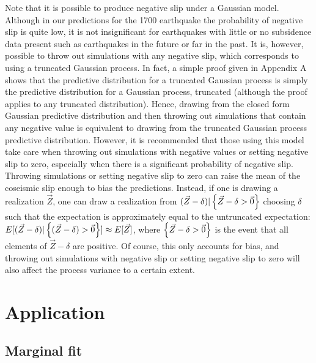 {Note that it is possible to produce negative slip under a Gaussian model.  Although in our predictions for the 1700 earthquake the probability of negative slip is quite low, it is not insignificant for earthquakes with little or no subsidence data present such as earthquakes in the future or far in the past.  It is, however, possible to throw out simulations with any negative slip, which corresponds to using a truncated Gaussian process.  In fact, a simple proof given in Appendix A shows that the predictive distribution for a truncated Gaussian process is simply the predictive distribution for a Gaussian process, truncated (although the proof applies to any truncated distribution).  Hence, drawing from the closed form Gaussian predictive distribution and then throwing out simulations that contain any negative value is equivalent to drawing from the truncated Gaussian process predictive distribution.  However, it is recommended that those using this model take care when throwing out simulations with negative values or setting negative slip to zero, especially when there is a significant probability of negative slip.  Throwing simulations or setting negative slip to zero can raise the mean of the coseismic slip enough to bias the predictions.  Instead, if one is drawing a realization $\vec{Z}$, one can draw a realization from $(\vec{Z} - \delta)  \vert \left\{\vec{Z} - \delta > \vec{0}\right\}$ choosing $\delta$ such that the expectation is approximately equal to the untruncated expectation: $E[(\vec{Z} - \delta) \vert \left\{(\vec{Z} - \delta) > \vec{0}\right\}] \approx E[\vec{Z}]$, where $\left\{\vec{Z} - \delta > \vec{0}\right\}$ is the event that all elements of $\vec{Z} - \delta$ are positive.   Of course, this only accounts for bias, and throwing out simulations with negative slip or setting negative slip to zero will also affect the process variance to a certain extent.

\section{Application}
\label{application}

\FloatBarrier
\subsection{Marginal fit}
\label{marginalFit}

}

